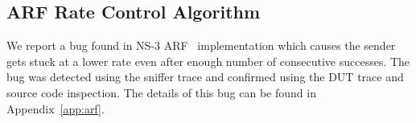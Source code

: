 \subsection{ARF Rate Control Algorithm}
\label{subsec:arf}

We report a bug found in NS-3 ARF~\cite{kamerman1997wavelan} implementation
which causes the sender gets stuck at a lower rate even after enough number of
consecutive successes. The bug was detected using the sniffer trace and
confirmed using the DUT trace and source code inspection. The details of this
bug can be found in Appendix~\ref{app:arf}.
